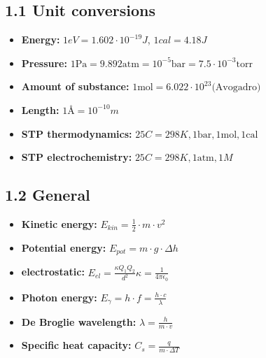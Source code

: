 \subsection{1.1 Unit conversions}
	\begin{itemize}
		\itemsep0em
		\raggedright
  		\item \textbf{Energy:} $1eV=1.602\cdot 10^{-19}J$,    $1cal=4.18J$
    	\item \textbf{Pressure:} $1 \textrm{Pa} = 9.892 \textrm{atm} = 10^{-5} \textrm{bar} = 7.5\cdot 10^{-3} \textrm{torr}$
    	\item \textbf{Amount of substance:} $1 \textrm{mol} = 6.022\cdot 10^{23} \textrm{(Avogadro)}$
    	\item \textbf{Length:} $1\text{Å}=10^{-10}m$
    	\item \textbf{STP thermodynamics: } $25C=298K, 1\textrm{bar}, 1 \textrm{mol}, 1 \textrm{cal}$
    	\item \textbf{STP electrochemistry: } $25C=298K, 1 \textrm{atm}, 1 M$
	\end{itemize}

\subsection{1.2 General}
    \begin{itemize}
		\itemsep0em
        \item \textbf{Kinetic energy:} $E_{kin} = \frac{1}{2} \cdot m \cdot v^2$
        \item \textbf{Potential energy:} $E_{pot} = m \cdot g \cdot \Delta h$
        \item \textbf{electrostatic:} $E_{el}=\frac{\kappa Q_1Q_2}{d^2}$\quad $\kappa = \frac{1}{4\pi \epsilon_0}$
        \item \textbf{Photon energy: } $E_\gamma = h\cdot f = \frac{h\cdot c}{\lambda}$
        \item \textbf{De Broglie wavelength: } $\lambda = \frac{h}{m\cdot v}$
        \item \textbf{Specific heat capacity: }$C_s=\frac{q}{m\cdot\Delta T}$
    \end{itemize}
    	
